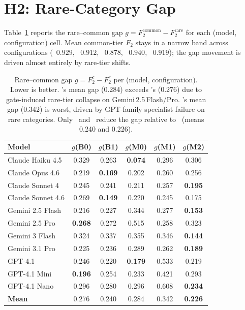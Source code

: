 \section{H2: Rare-Category Gap}\label{sec:res:h2}

Table~\ref{tab:h2-tier} reports the rare--common gap
$g = F_2^{\text{common}} - F_2^{\text{rare}}$ for each (model, configuration)
cell. Mean common-tier $F_2$ stays in a narrow band across configurations
(\cfgZS\ $0.929$, \cfgCoT\ $0.912$, \cfgCX\ $0.878$, \cfgMA\ $0.940$, \cfgCP\
$0.919$); the gap movement is driven almost entirely by rare-tier shifts.

\begin{table}[htbp]
  \centering
  \small
  \caption{Rare--common gap $g = F_2^c - F_2^r$ per (model, configuration).
  Lower is better. \cfgCX's mean gap (0.284) exceeds \cfgZS's (0.276) due to
  gate-induced rare-tier collapse on Gemini\,2.5\,Flash/Pro. \cfgMA's mean
  gap (0.342) is worst, driven by GPT-family specialist failure on rare
  categories. Only \cfgCoT\ and \cfgCP\ reduce the gap relative to \cfgZS\
  (means 0.240 and 0.226).}
  \label{tab:h2-tier}
  \begin{tabular*}{\linewidth}{@{\extracolsep{\fill}}lccccc@{}}
    \toprule
    \textbf{Model} & $g$(B0) & $g$(B1) & $g$(M0) & $g$(M1) & $g$(M2) \\
    \midrule
    Claude Haiku 4.5   & 0.329 & 0.263 & \textbf{0.074} & 0.296 & 0.306 \\
    Claude Opus 4.6    & 0.219 & \textbf{0.169} & 0.202 & 0.260 & 0.256 \\
    Claude Sonnet 4    & 0.245 & 0.241 & 0.211 & 0.257 & \textbf{0.195} \\
    Claude Sonnet 4.6  & 0.269 & \textbf{0.149} & 0.220 & 0.245 & 0.175 \\
    Gemini 2.5 Flash   & 0.216 & 0.227 & 0.344 & 0.277 & \textbf{0.153} \\
    Gemini 2.5 Pro     & \textbf{0.268} & 0.272 & 0.515 & 0.258 & 0.323 \\
    Gemini 3 Flash     & 0.324 & 0.337 & 0.355 & 0.346 & \textbf{0.144} \\
    Gemini 3.1 Pro     & 0.225 & 0.236 & 0.289 & 0.262 & \textbf{0.189} \\
    GPT-4.1            & 0.246 & 0.220 & \textbf{0.179} & 0.533 & 0.219 \\
    GPT-4.1 Mini       & \textbf{0.196} & 0.254 & 0.233 & 0.421 & 0.293 \\
    GPT-4.1 Nano       & 0.296 & 0.280 & 0.296 & 0.608 & \textbf{0.234} \\
    \midrule
    \textbf{Mean}      & 0.276 & 0.240 & 0.284 & 0.342 & \textbf{0.226} \\
    \bottomrule
  \end{tabular*}
\end{table}

